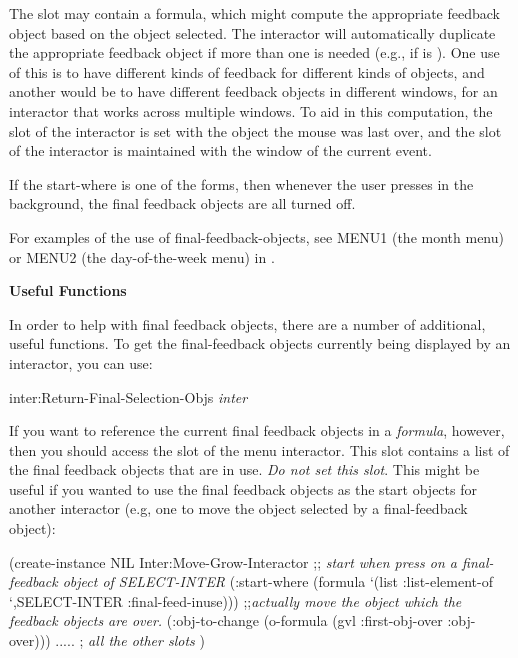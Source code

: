 The  slot may contain a formula, which might compute
the appropriate feedback
object based on the object selected.  The interactor will
automatically duplicate the appropriate feedback object if more than
one is needed (e.g., if  is ).   One use
of this is to have different kinds of feedback for different kinds of
objects, and another would be to have different feedback objects in
different windows, for an interactor that works across multiple windows.
 
To aid in this computation, the  slot of the
interactor is set with the object the mouse was last over, and the
 slot of the interactor is maintained with the
window of the current event.

If the start-where is one of the  forms, then whenever the
user presses in the background, the final feedback objects are all turned off.

For examples of the use of final-feedback-objects, see MENU1 (the month menu)
or MENU2 (the day-of-the-week menu) in .

{\bf Useful Functions}

In order to help with final feedback objects, there are a number of
additional, useful functions.  To get the final-feedback objects currently
being displayed by an interactor, you can use:

\begin{programexample}
inter:Return-Final-Selection-Objs {\it inter}\value{function}
\end{programexample}


If you want to reference the current final feedback objects in a
{\it formula}, however,
then you should access the  slot of the menu
interactor.  This slot contains
a list of the final feedback objects that are in use.  {\it Do not set
this slot}.
This might be useful if you wanted to use the final feedback objects as the
start objects for another interactor (e.g, one to move the object selected
by a final-feedback object):
\begin{programexample}
(create-instance NIL Inter:Move-Grow-Interactor
   ;; {\it start when press on a final-feedback object of SELECT-INTER}
   (:start-where (formula `(list :list-element-of
                                 `,SELECT-INTER :final-feed-inuse)))
   ;;{\it actually move the object which the feedback objects are over.}
   (:obj-to-change (o-formula (gvl :first-obj-over :obj-over)))
   ..... ; {\it all the other slots}
   )
\end{programexample}

